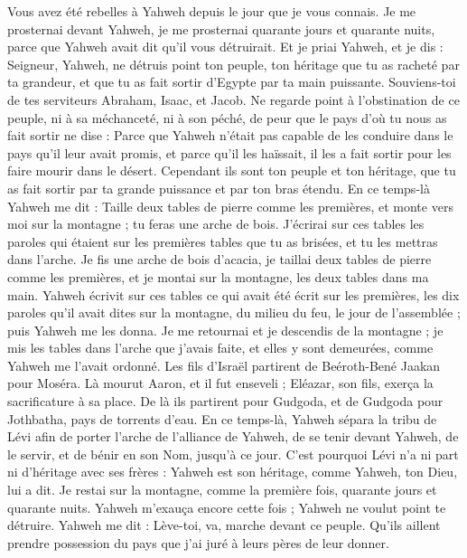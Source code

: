 \begin{multicols}{2}
Vous avez été rebelles à Yahweh depuis le jour que je vous connais.
Je me prosternai devant Yahweh, je me prosternai quarante jours et quarante nuits, parce que Yahweh avait dit qu'il vous détruirait.
Et je priai Yahweh, et je dis : Seigneur, Yahweh, ne détruis point ton peuple, ton héritage que tu as racheté par ta grandeur, et que tu as fait sortir d'Egypte par ta main puissante.
Souviens-toi de tes serviteurs Abraham, Isaac, et Jacob. Ne regarde point à l'obstination de ce peuple, ni à sa méchanceté, ni à son péché,
de peur que le pays d'où tu nous as fait sortir ne dise : Parce que Yahweh n'était pas capable de les conduire dans le pays qu'il leur avait promis, et parce qu'il les haïssait, il les a fait sortir pour les faire mourir dans le désert.
Cependant ils sont ton peuple et ton héritage, que tu as fait sortir par ta grande puissance et par ton bras étendu.
\VerseOne{}En ce temps-là Yahweh me dit : Taille deux tables de pierre comme les premières, et monte vers moi sur la montagne ; tu feras une arche de bois.
J'écrirai sur ces tables les paroles qui étaient sur les premières tables que tu as brisées, et tu les mettras dans l'arche.
Je fis une arche de bois d'acacia, je taillai deux tables de pierre comme les premières, et je montai sur la montagne, les deux tables dans ma main.
Yahweh écrivit sur ces tables ce qui avait été écrit sur les premières, les dix paroles qu'il avait dites sur la montagne, du milieu du feu, le jour de l'assemblée ; puis Yahweh me les donna.
Je me retournai et je descendis de la montagne ; je mis les tables dans l'arche que j'avais faite, et elles y sont demeurées, comme Yahweh me l'avait ordonné.
Les fils d'Israël partirent de Beéroth-Bené Jaakan pour Moséra. Là mourut Aaron, et il fut enseveli ; Eléazar, son fils, exerça la sacrificature à sa place.
De là ils partirent pour Gudgoda, et de Gudgoda pour Jothbatha, pays de torrents d'eau.
En ce temps-là, Yahweh sépara la tribu de Lévi afin de porter l'arche de l'alliance de Yahweh, de se tenir devant Yahweh, de le servir, et de bénir en son Nom, jusqu'à ce jour.
C'est pourquoi Lévi n'a ni part ni d'héritage avec ses frères : Yahweh est son héritage, comme Yahweh, ton Dieu, lui a dit.
Je restai sur la montagne, comme la première fois, quarante jours et quarante nuits. Yahweh m'exauça encore cette fois ; Yahweh ne voulut point te détruire.
Yahweh me dit : Lève-toi, va, marche devant ce peuple. Qu'ils aillent prendre possession du pays que j'ai juré à leurs pères de leur donner.

\end{multicols}
